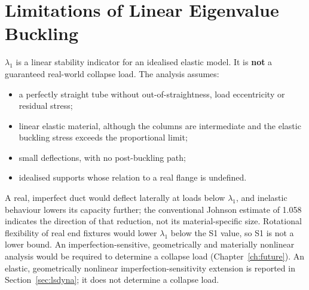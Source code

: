 \section{Limitations of Linear Eigenvalue Buckling}
$\lambda_1$ is a linear stability indicator for an idealised elastic model. It is \textbf{not} a guaranteed real-world collapse load. The
analysis assumes:
\begin{itemize}
\item a perfectly straight tube without out-of-straightness, load eccentricity or residual stress;
\item linear elastic material, although the columns are intermediate and the elastic buckling stress exceeds the proportional limit;
\item small deflections, with no post-buckling path;
\item idealised supports whose relation to a real flange is undefined.
\end{itemize}
A real, imperfect duct would deflect laterally at loads below $\lambda_1$, and inelastic behaviour lowers its capacity further; the
conventional Johnson estimate of 1.058 indicates the direction of that reduction, not its material-specific size. Rotational flexibility of
real end fixtures would lower $\lambda_1$ below the S1 value, so S1 is not a lower bound. An imperfection-sensitive, geometrically and
materially nonlinear analysis would be required to determine a collapse load (Chapter~\ref{ch:future}). An elastic, geometrically
nonlinear imperfection-sensitivity extension is reported in Section~\ref{sec:lsdyna}; it does not determine a collapse load.
